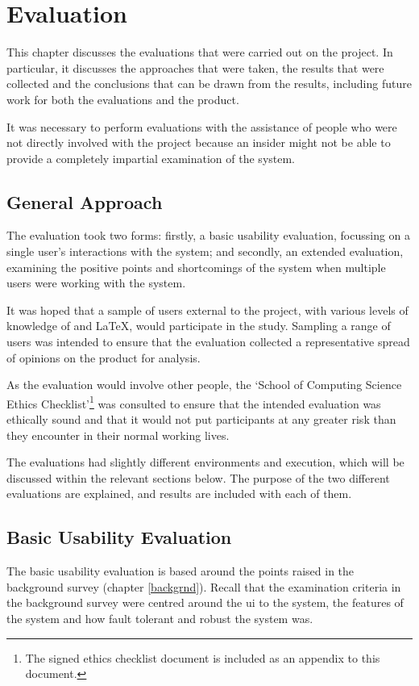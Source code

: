 \chapter{Evaluation}
\label{eval}
This chapter discusses the evaluations that were carried out on the project.  In particular, it discusses the approaches that were taken, the results that were collected and the conclusions that can be drawn from the results, including future work for both the evaluations and the product.

It was necessary to perform evaluations with the assistance of people who were not directly involved with the project because an insider might not be able to provide a completely impartial examination of the system.

\section{General Approach}
The evaluation took two forms: firstly, a basic usability evaluation, focussing on a single user's interactions with the system; and secondly, an extended evaluation, examining the positive points and shortcomings of the system when multiple users were working with the system.

It was hoped that a sample of users external to the project, with various levels of knowledge of \bibtex and \LaTeX, would participate in the study.  Sampling a range of users was intended to ensure that the evaluation collected a representative spread of opinions on the product for analysis.

As the evaluation would involve other people, the `School of Computing Science Ethics Checklist'\footnote{The signed ethics checklist document is included as an appendix to this document.} was consulted to ensure that the intended evaluation was ethically sound and that it would not put participants at any greater risk than they encounter in their normal working lives.

The evaluations had slightly different environments and execution, which will be discussed within the relevant sections below.  The purpose of the two different evaluations are explained, and results are included with each of them.

\section{Basic Usability Evaluation}
The basic usability evaluation is based around the points raised in the background survey (chapter \ref{backgrnd}).  Recall that the examination criteria in the background survey were centred around the \gls{ui} to the system, the features of the system and how fault tolerant and robust the system was.

